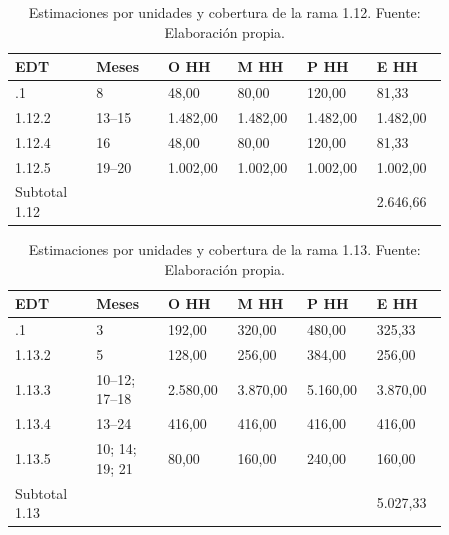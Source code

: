 \documentclass[11pt]{article}
\begin{document}
\begingroup
\small
\begin{longtable}{@{}p{0.17\linewidth}p{0.15\linewidth}p{0.13\linewidth}p{0.13\linewidth}p{0.13\linewidth}p{0.15\linewidth}@{}}
\caption[Estimaciones por unidades y cobertura de la rama 1.12]{Estimaciones por unidades y cobertura de la rama 1.12. Fuente: Elaboración propia.}\label{tab:t15-tareas-12}\\
\toprule
\textbf{EDT} & \textbf{Meses} & \textbf{O HH} & \textbf{M HH} & \textbf{P HH} & \textbf{E HH} \\
\midrule
\endhead
\bottomrule
\endlastfoot
1.12.1 & 8 & 48,00 & 80,00 & 120,00 & 81,33 \\
1.12.2 & 13--15 & 1.482,00 & 1.482,00 & 1.482,00 & 1.482,00 \\
1.12.4 & 16 & 48,00 & 80,00 & 120,00 & 81,33 \\
1.12.5 & 19--20 & 1.002,00 & 1.002,00 & 1.002,00 & 1.002,00 \\
Subtotal 1.12 &  &  &  &  & 2.646,66 \\
\end{longtable}
\endgroup



\begingroup
\small
\begin{longtable}{@{}p{0.17\linewidth}p{0.15\linewidth}p{0.13\linewidth}p{0.13\linewidth}p{0.13\linewidth}p{0.15\linewidth}@{}}
\caption[Estimaciones por unidades y cobertura de la rama 1.13]{Estimaciones por unidades y cobertura de la rama 1.13. Fuente: Elaboración propia.}\label{tab:t15-tareas-13}\\
\toprule
\textbf{EDT} & \textbf{Meses} & \textbf{O HH} & \textbf{M HH} & \textbf{P HH} & \textbf{E HH} \\
\midrule
\endhead
\bottomrule
\endlastfoot
1.13.1 & 3 & 192,00 & 320,00 & 480,00 & 325,33 \\
1.13.2 & 5 & 128,00 & 256,00 & 384,00 & 256,00 \\
1.13.3 & 10--12; 17--18 & 2.580,00 & 3.870,00 & 5.160,00 & 3.870,00 \\
1.13.4 & 13--24 & 416,00 & 416,00 & 416,00 & 416,00 \\
1.13.5 & 10; 14; 19; 21 & 80,00 & 160,00 & 240,00 & 160,00 \\
Subtotal 1.13 &  &  &  &  & 5.027,33 \\
\end{longtable}
\endgroup
\end{document}
